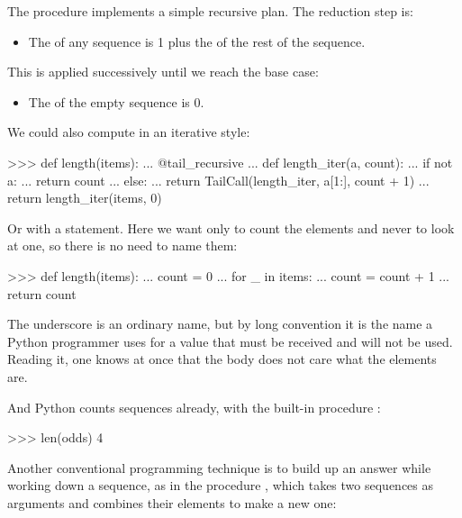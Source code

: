 \noindent
The  procedure implements a simple recursive plan.  The reduction
step is:

\begin{itemize}
\item
The  of any sequence is 1 plus the  of the rest of
the sequence.
\end{itemize}

\noindent
This is applied successively until we reach the base case:

\begin{itemize}
\item
The  of the empty sequence is 0.
\end{itemize}

\noindent
We could also compute  in an iterative style:

\begin{codeBlock}
>>> def length(items):
...     @tail_recursive
...     def length_iter(a, count):
...         if not a:
...             return count
...         else:
...             return TailCall(length_iter, a[1:], count + 1)
...     return length_iter(items, 0)
\end{codeBlock}

\noindent
\begin{revealTheSurface}
Or with a  statement.  Here we want only to count the elements and
never to look at one, so there is no need to name them:

\begin{codeBlock}
>>> def length(items):
...     count = 0
...     for _ in items:
...         count = count + 1
...     return count
\end{codeBlock}

\noindent
The underscore is an ordinary name, but by long convention it is the name a
Python programmer uses for a value that must be received and will not be used.
Reading it, one knows at once that the body does not care what the elements
are.

And Python counts sequences already, with the built-in procedure :

\begin{codeBlock}
>>> len(odds)
4
\end{codeBlock}
\end{revealTheSurface}

Another conventional programming technique is to build up an answer while
working down a sequence, as in the procedure , which takes two
sequences as arguments and combines their elements to make a new one:

